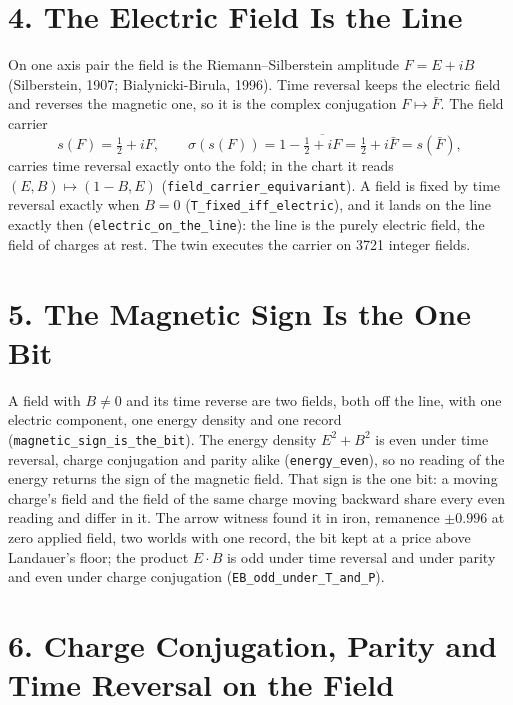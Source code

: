 \documentclass[10pt]{article}
\begin{document}
\hypertarget{the-electric-field-is-the-line}{%
\section{4. The Electric Field Is the
Line}\label{the-electric-field-is-the-line}}

On one axis pair the field is the Riemann--Silberstein amplitude
\(F=E+iB\) (Silberstein, 1907; Bialynicki-Birula, 1996). Time reversal
keeps the electric field and reverses the magnetic one, so it is the
complex conjugation \(F\mapsto\bar F\). The field carrier
\[s(F)=\tfrac12+iF,\qquad \sigma(s(F))=1-\overline{\tfrac12+iF}=\tfrac12+i\bar F=s(\bar F),\]
carries time reversal exactly onto the fold; in the chart it reads
\((E,B)\mapsto(1-B,E)\) (\texttt{field\_carrier\_equivariant}). A field
is fixed by time reversal exactly when \(B=0\)
(\texttt{T\_fixed\_iff\_electric}), and it lands on the line exactly
then (\texttt{electric\_on\_the\_line}): the line is the purely electric
field, the field of charges at rest. The twin executes the carrier on
3721 integer fields.

\hypertarget{the-magnetic-sign-is-the-one-bit}{%
\section{5. The Magnetic Sign Is the One
Bit}\label{the-magnetic-sign-is-the-one-bit}}

A field with \(B\neq0\) and its time reverse are two fields, both off
the line, with one electric component, one energy density and one record
(\texttt{magnetic\_sign\_is\_the\_bit}). The energy density \(E^2+B^2\)
is even under time reversal, charge conjugation and parity alike
(\texttt{energy\_even}), so no reading of the energy returns the sign of
the magnetic field. That sign is the one bit: a moving charge's field
and the field of the same charge moving backward share every even
reading and differ in it. The arrow witness found it in iron, remanence
\(\pm0.996\) at zero applied field, two worlds with one record, the bit
kept at a price above Landauer's floor; the product \(E\cdot B\) is odd
under time reversal and under parity and even under charge conjugation
(\texttt{EB\_odd\_under\_T\_and\_P}).

\hypertarget{charge-conjugation-parity-and-time-reversal-on-the-field}{%
\section{6. Charge Conjugation, Parity and Time Reversal on the
Field}\label{charge-conjugation-parity-and-time-reversal-on-the-field}}
\end{document}
